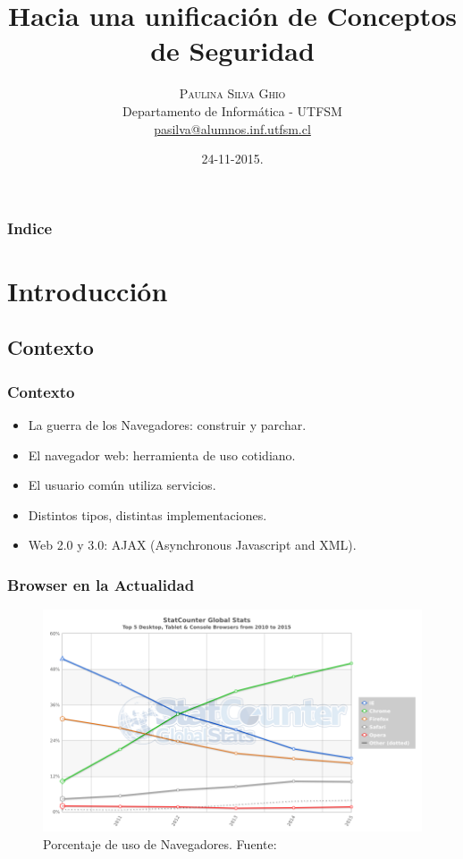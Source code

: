 \documentclass[serif,9pt]{beamer}
\begin{document}
\title[Una Arquitectura de Referencia para Web
Browsers]{Hacia una unificaci\'on de Conceptos de Seguridad} 
\author[Paulina Silva Ghio]{\textsc{Paulina Silva Ghio} \\ \medskip
\small{}
Departamento de Inform\'atica - UTFSM\\ \medskip
\url{pasilva@alumnos.inf.utfsm.cl}}
\institute[]{}
\date{24-11-2015.}

\begin{frame}[plain]
\titlepage
\end{frame}


\begin{frame}
\frametitle{Indice}
\tableofcontents
\end{frame} 


\section{Introducci\'on}
\subsection{Contexto}
\begin{frame}
\frametitle{Contexto}

	\begin{itemize}
		\item<1-> La guerra de los Navegadores: construir y parchar.
		\item<2-> El navegador web: herramienta de uso cotidiano.
		\item<3-> El usuario com\'un utiliza servicios.
		\item<4-> Distintos tipos, distintas implementaciones.
		\item<5-> Web 2.0 y 3.0: AJAX (Asynchronous Javascript and XML).
	\end{itemize}
\end{frame}


\begin{frame}
\frametitle{Browser en la Actualidad}
	\begin{figure}[h]
	    \centering
	    \includegraphics[width=1\textwidth]{figures/StatCounter-browser-ww-yearly-2010-2015.png}
	    \caption{Porcentaje de uso de Navegadores. Fuente: \cite{statBrow}}
	    \label{fig:UsageShare}
	\end{figure}
\end{frame}
\end{document}
